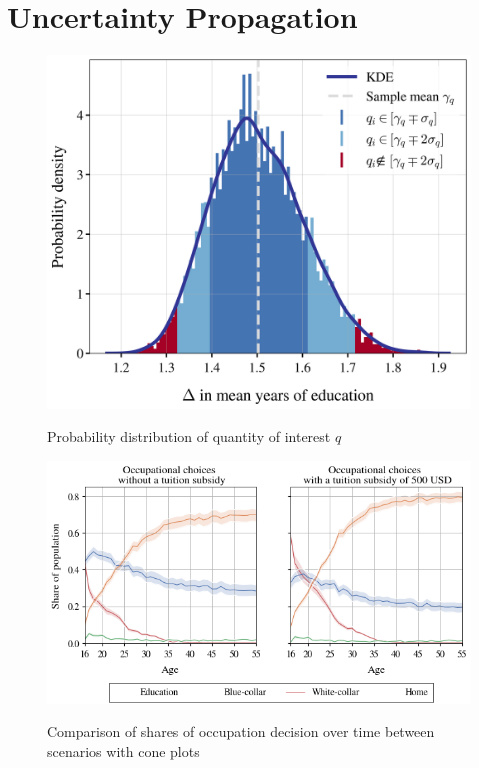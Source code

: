 \section{Uncertainty Propagation}
\thispagestyle{plain} %

\begin{figure}[H]
	\caption{Probability distribution of quantity of interest $q$}
	\centering
	\includegraphics[scale=0.7]{../python/figures/distplot}
	\label{fig:dist}
\end{figure}

\begin{figure}[H]
	\caption{Comparison of shares of occupation decision over time between scenarios with cone plots}
	\centering
	\includegraphics[scale=0.75]{../python/figures/cone_plot_choice_shares}
	\label{fig:paths}
\end{figure}


